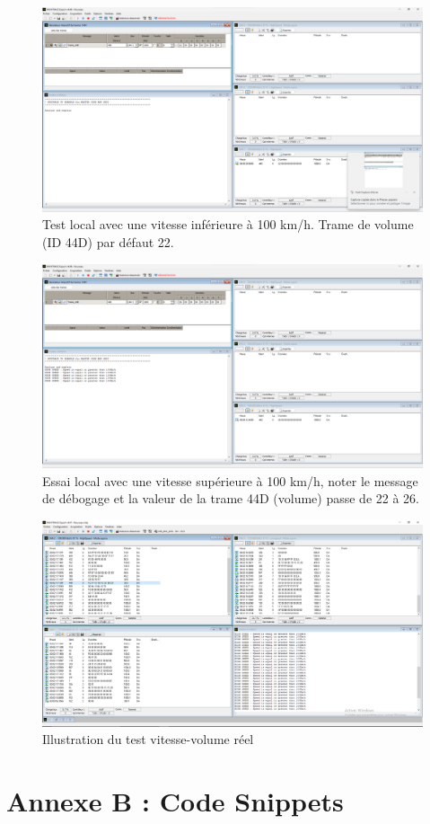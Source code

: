 \documentclass{rapportECC}
\begin{document}
\begin{figure}[H]
    \centering
    \includegraphics[width=.7\textwidth]{./images/test1.png}
    \caption{Test local avec une vitesse inférieure à 100 km/h. Trame de volume (ID 44D) par défaut 22.}
    \label{fig:test_local_1}
\end{figure}

\begin{figure}[H]
    \centering
    \includegraphics[width=.7\textwidth]{./images/test1_2.png}
    \caption{Essai local avec une vitesse supérieure à 100 km/h, noter le message de débogage et la valeur de la trame 44D (volume) passe de 22 à 26.}
    \label{fig:test_local_2}
\end{figure}

\begin{figure}[H]
    \centering
    \includegraphics[width=.9\textwidth]{./images/Real_Limit_vitesse.png}
    \caption{Illustration du test vitesse-volume réel}
    \label{fig:real_limit_vitesse}
\end{figure}

\pagebreak

\section{Annexe B : Code Snippets}\label{sec:annexeB}




\end{document}
